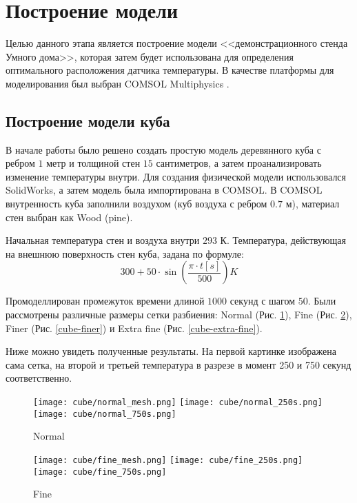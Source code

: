 \graphicspath{{./images/model}}
\section{Построение модели}

Целью данного этапа является построение модели <<демонстрационного стенда Умного дома>>, которая затем будет использована для определения оптимального расположения датчика температуры. В качестве платформы для моделирования был выбран COMSOL Multiphysics \cite{comsol}.


\subsection{Построение модели куба}

В начале работы было решено создать простую модель деревянного куба с ребром $1$ метр и толщиной стен $15$ сантиметров, а затем проанализировать изменение температуры внутри. Для создания физической модели использовался SolidWorks, а затем модель была импортирована в COMSOL. В COMSOL внутренность куба заполнили воздухом (куб воздуха с ребром $0.7$ м), материал стен выбран как Wood (pine).

Начальная температура стен и воздуха внутри $293$ К. Температура, действующая на внешнюю поверхность стен куба, задана по формуле:
\[300 + 50 \cdot \sin(\frac{\pi \cdot t[s]}{500}) K\]

Промоделлирован промежуток времени длиной $1000$ секунд с шагом $50$.
Были рассмотрены различные размеры сетки разбиения: Normal (Рис. \ref{cube-normal}), Fine (Рис. \ref{cube-fine}), Finer (Рис. \ref{cube-finer}) и Extra fine (Рис. \ref{cube-extra-fine}).

Ниже можно увидеть полученные результаты. На первой картинке изображена сама сетка, на второй и третьей температура в разрезе в момент 250 и 750 секунд соответственно.

\begin{figure}[H]
\texttt{[image: cube/normal\_mesh.png]}\hfill
\texttt{[image: cube/normal\_250s.png]}\hfill
\texttt{[image: cube/normal\_750s.png]}\hfill
\caption{Normal}
\label{cube-normal}
\end{figure}

\begin{figure}[H]
\texttt{[image: cube/fine\_mesh.png]}\hfill
\texttt{[image: cube/fine\_250s.png]}\hfill
\texttt{[image: cube/fine\_750s.png]}\hfill
\caption{Fine}
\label{cube-fine}
\end{figure}

